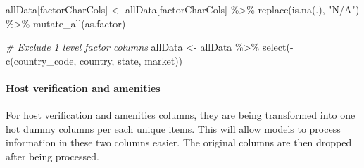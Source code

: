 \documentclass[
]{article}
\newenvironment{Shaded}{\begin{snugshade}}{\end{snugshade}}
\newcommand{\CommentTok}[1]{\textcolor[rgb]{0.56,0.35,0.01}{\textit{#1}}}
\newcommand{\FunctionTok}[1]{\textcolor[rgb]{0.00,0.00,0.00}{#1}}
\newcommand{\NormalTok}[1]{#1}
\newcommand{\OtherTok}[1]{\textcolor[rgb]{0.56,0.35,0.01}{#1}}
\newcommand{\SpecialCharTok}[1]{\textcolor[rgb]{0.00,0.00,0.00}{#1}}
\newcommand{\StringTok}[1]{\textcolor[rgb]{0.31,0.60,0.02}{#1}}
\begin{document}
\begin{Shaded}
\begin{Highlighting}[]
\NormalTok{allData[factorCharCols] }\OtherTok{\textless{}{-}}\NormalTok{ allData[factorCharCols] }\SpecialCharTok{\%\textgreater{}\%}
  \FunctionTok{replace}\NormalTok{(}\FunctionTok{is.na}\NormalTok{(.), }\StringTok{"N/A"}\NormalTok{) }\SpecialCharTok{\%\textgreater{}\%}
  \FunctionTok{mutate\_all}\NormalTok{(as.factor)}

\CommentTok{\# Exclude 1 level factor columns }
\NormalTok{allData }\OtherTok{\textless{}{-}}\NormalTok{ allData }\SpecialCharTok{\%\textgreater{}\%} \FunctionTok{select}\NormalTok{(}\SpecialCharTok{{-}}\FunctionTok{c}\NormalTok{(country\_code, country, state, market)) }
\end{Highlighting}
\end{Shaded}

\hypertarget{host-verification-and-amenities}{%
\paragraph{Host verification and
amenities}\label{host-verification-and-amenities}}

For host verification and amenities columns, they are being transformed
into one hot dummy columns per each unique items. This will allow models
to process information in these two columns easier. The original columns
are then dropped after being processed.
\end{document}
